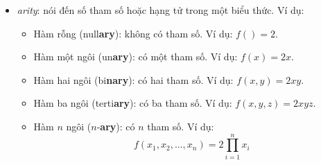 \begin{itemize}
    \item \textit{arity}: nói đến số tham số hoặc hạng tử trong một biểu thức. Ví dụ: \begin{itemize}
        \item Hàm rỗng (null\textbf{ary}): không có tham số. Ví dụ: $f()=2$.
        \item Hàm một ngôi (un\textbf{ary}): có một tham số. Ví dụ: $f(x)=2x$.
        \item Hàm hai ngôi (bi\textbf{nary}): có hai tham số. Ví dụ: $f(x,y)=2xy$.
        \item Hàm ba ngôi (terti\textbf{ary}): có ba tham số. Ví dụ: $f(x,y,z)=2xyz$.
        \item Hàm $n$ ngôi ($n$-\textbf{ary}): có $n$ tham số. Ví dụ: $$f(x_1,x_2,\dots,x_n)=2\prod_{i=1}^n x_i$$
    \end{itemize}
\end{itemize}